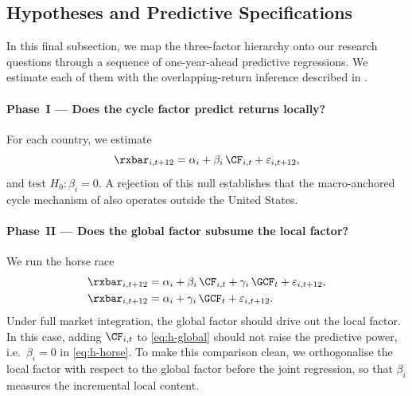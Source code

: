 \subsection{Hypotheses and Predictive Specifications}
\label{sec:fw-hypotheses}

In this final subsection, we map the three-factor hierarchy onto our research
questions through a sequence of one-year-ahead predictive regressions. We
estimate each of them with the overlapping-return inference described in
.

\paragraph{Phase~I --- Does the cycle factor predict returns locally?}
For each country, we estimate
\begin{equation}
  \rxbar_{i,t+12} = \alpha_{i} + \beta_{i}\,\CF_{i,t} + \varepsilon_{i,t+12},
  \label{eq:h-local}
\end{equation}
and test $H_{0}\!:\beta_{i}=0$. A rejection of this null establishes that the
macro-anchored cycle mechanism of \citet{cieslak2015} also operates outside the
United States.

\paragraph{Phase~II --- Does the global factor subsume the local factor?}
We run the horse race
\begin{align}
  \rxbar_{i,t+12} &= \alpha_{i} + \beta_{i}\,\CF_{i,t}
                     + \gamma_{i}\,\GCF_{t} + \varepsilon_{i,t+12},
                     \label{eq:h-horse}\\
  \rxbar_{i,t+12} &= \alpha_{i} + \gamma_{i}\,\GCF_{t} + \varepsilon_{i,t+12}.
                     \label{eq:h-global}
\end{align}
Under full market integration, the global factor should drive out the local
factor. In this case, adding $\CF_{i,t}$ to \eqref{eq:h-global} should not
raise the predictive power, i.e.\ $\beta_{i}=0$ in \eqref{eq:h-horse}. To make
this comparison clean, we orthogonalise the local factor with respect to the
global factor before the joint regression, so that $\beta_{i}$ measures the
incremental local content.

